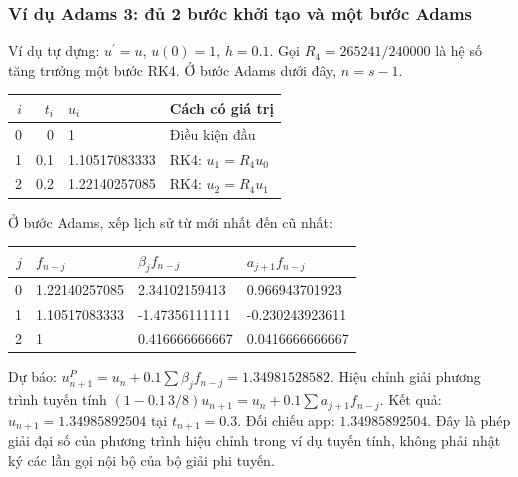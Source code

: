 \subsubsection*{Ví dụ Adams 3: đủ 2 bước khởi tạo và một bước Adams}
Ví dụ tự dựng: $u^{\prime}=u$, $u(0)=1$, $h=0.1$. Gọi $R_4=265241/240000$ là hệ số tăng trưởng một bước RK4. Ở bước Adams dưới đây, $n=s-1$.
\begin{center}\begin{tabular}{rrll}\toprule $i$&$t_i$&$u_i$&Cách có giá trị\\\midrule
0&0&1&Điều kiện đầu\\
1&0.1&1.10517083333&RK4: $u_1 = R_4u_{0}$\\
2&0.2&1.22140257085&RK4: $u_2 = R_4u_{1}$\\
\bottomrule\end{tabular}\end{center}
Ở bước Adams, xếp lịch sử từ mới nhất đến cũ nhất:
\begin{center}\begin{tabular}{rlll}\toprule $j$&$f_{n-j}$&$\beta_jf_{n-j}$&$a_{j+1}f_{n-j}$\\\midrule
0&1.22140257085&2.34102159413&0.966943701923\\
1&1.10517083333&-1.47356111111&-0.230243923611\\
2&1&0.416666666667&0.0416666666667\\
\bottomrule\end{tabular}\end{center}
Dự báo: $u_{n+1}^P=u_n+0.1\sum\beta_jf_{n-j}=1.34981528582$.
Hiệu chỉnh giải phương trình tuyến tính $(1-0.1\,3/8)u_{n+1}=u_n+0.1\sum a_{j+1}f_{n-j}$.
Kết quả: $u_{n+1}=1.34985892504$ tại $t_{n+1}=0.3$. Đối chiếu app: $1.34985892504$.
Đây là phép giải đại số của phương trình hiệu chỉnh trong ví dụ tuyến tính, không phải nhật ký các lần gọi nội bộ của bộ giải phi tuyến.
\examplebreak
